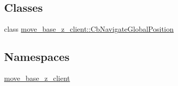 \subsection*{Classes}
\begin{DoxyCompactItemize}
\item 
class \hyperlink{classmove__base__z__client_1_1CbNavigateGlobalPosition}{move\+\_\+base\+\_\+z\+\_\+client\+::\+Cb\+Navigate\+Global\+Position}
\end{DoxyCompactItemize}
\subsection*{Namespaces}
\begin{DoxyCompactItemize}
\item 
 \hyperlink{namespacemove__base__z__client}{move\+\_\+base\+\_\+z\+\_\+client}
\end{DoxyCompactItemize}
